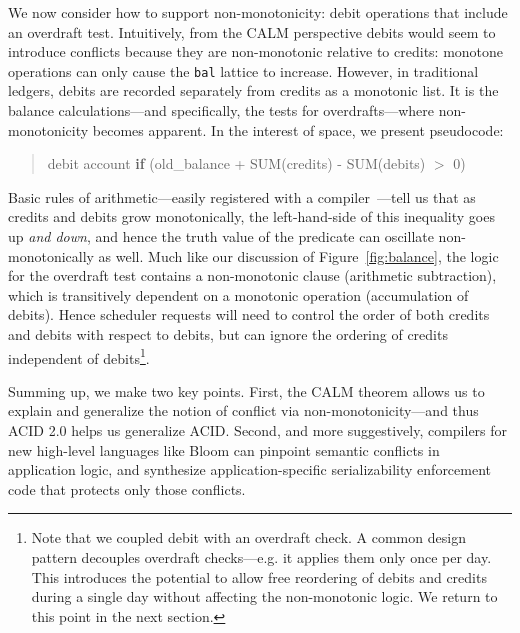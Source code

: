\documentclass{sig-alternate}
\begin{document}
We now consider how to support non-monotonicity: debit operations that include an overdraft test. 
Intuitively, from the CALM perspective debits would seem to introduce conflicts because they are 
non-monotonic relative to credits: monotone operations can only cause the
\texttt{bal} lattice to increase. However, in traditional ledgers, debits are recorded separately from credits as a monotonic list.  It is the balance calculations---and specifically, the tests for overdrafts---where non-monotonicity becomes apparent.  In the interest of space, we present pseudocode:
\begin{quote}
	\begin{scriptsize}
 	\textsf{debit account \textbf{if} (old\_balance + SUM(credits) - SUM(debits) $>$ 0)}
	\end{scriptsize}
\end{quote}
Basic rules of arithmetic---easily registered with a compiler~\cite{Conway2012}---tell us that as credits and debits grow monotonically, the left-hand-side of this inequality goes up {\em and down}, and hence the truth value of the predicate can oscillate non-monotonically as well.  Much like our discussion of Figure~\ref{fig:balance}, the logic for the overdraft test contains a non-monotonic clause (arithmetic subtraction), which is transitively dependent on a monotonic operation (accumulation of debits).  Hence scheduler requests will need to control the order of both credits and debits with respect to debits, but can ignore the ordering of credits independent of debits\footnote{Note that we coupled debit with an overdraft check.  A common design pattern decouples overdraft checks---e.g. it applies them only once per day.  This introduces the potential to allow free reordering of debits and credits during a single day without affecting the non-monotonic logic.  We return to this point in the next section.}.

Summing up, we make two key points.  First, the CALM theorem allows us to explain and generalize the notion of conflict via non-monotonicity---and thus ACID 2.0 helps us generalize ACID.  Second, and more suggestively, compilers for new high-level languages like Bloom can pinpoint semantic conflicts in application logic, and synthesize application-specific serializability enforcement code that protects only those conflicts.
\end{document}
